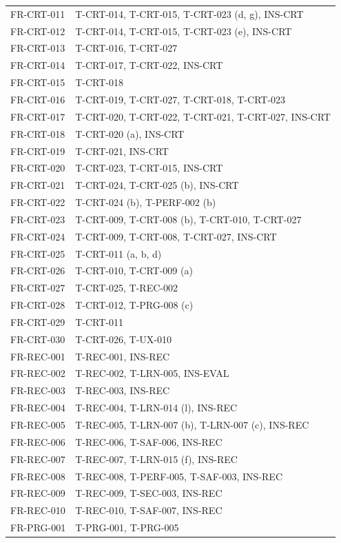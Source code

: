 \documentclass[12pt, titlepage]{article}
\begin{document}
{\begin{longtable}{@{}>{\raggedright\arraybackslash}p{}%
>{\raggedright\arraybackslash}p{}@{}}
FR-CRT-011 & T-CRT-014, T-CRT-015, T-CRT-023 (d, g), INS-CRT\\
FR-CRT-012 & T-CRT-014, T-CRT-015, T-CRT-023 (e), INS-CRT\\
FR-CRT-013 & T-CRT-016, T-CRT-027\\
FR-CRT-014 & T-CRT-017, T-CRT-022, INS-CRT\\
FR-CRT-015 & T-CRT-018\\
FR-CRT-016 & T-CRT-019, T-CRT-027, T-CRT-018, T-CRT-023\\
FR-CRT-017 & T-CRT-020, T-CRT-022, T-CRT-021, T-CRT-027, INS-CRT\\
FR-CRT-018 & T-CRT-020 (a), INS-CRT\\
FR-CRT-019 & T-CRT-021, INS-CRT\\
FR-CRT-020 & T-CRT-023, T-CRT-015, INS-CRT\\
FR-CRT-021 & T-CRT-024, T-CRT-025 (b), INS-CRT\\
FR-CRT-022 & T-CRT-024 (b), T-PERF-002 (b)\\
FR-CRT-023 & T-CRT-009, T-CRT-008 (b), T-CRT-010, T-CRT-027\\
FR-CRT-024 & T-CRT-009, T-CRT-008, T-CRT-027, INS-CRT\\
FR-CRT-025 & T-CRT-011 (a, b, d)\\
FR-CRT-026 & T-CRT-010, T-CRT-009 (a)\\
FR-CRT-027 & T-CRT-025, T-REC-002\\
FR-CRT-028 & T-CRT-012, T-PRG-008 (c)\\
FR-CRT-029 & T-CRT-011\\
FR-CRT-030 & T-CRT-026, T-UX-010\\
FR-REC-001 & T-REC-001, INS-REC\\
FR-REC-002 & T-REC-002, T-LRN-005, INS-EVAL\\
FR-REC-003 & T-REC-003, INS-REC\\
FR-REC-004 & T-REC-004, T-LRN-014 (l), INS-REC\\
FR-REC-005 & T-REC-005, T-LRN-007 (b), T-LRN-007 (c), INS-REC\\
FR-REC-006 & T-REC-006, T-SAF-006, INS-REC\\
FR-REC-007 & T-REC-007, T-LRN-015 (f), INS-REC\\
FR-REC-008 & T-REC-008, T-PERF-005, T-SAF-003, INS-REC\\
FR-REC-009 & T-REC-009, T-SEC-003, INS-REC\\
FR-REC-010 & T-REC-010, T-SAF-007, INS-REC\\
FR-PRG-001 & T-PRG-001, T-PRG-005\\

\end{longtable}}
\end{document}
